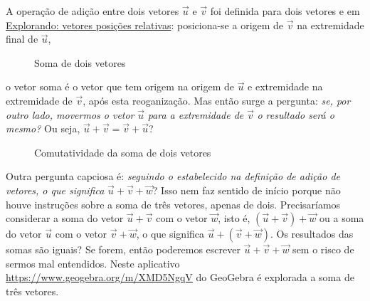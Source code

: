 A operação de adição entre dois vetores \(\vec{u}\) e \(\vec{v}\) foi definida para dois vetores e em \hyperref[vetores-exp1]{Explorando: vetores posições relativas}: posiciona-se a origem de \(\vec{v}\) na extremidade final de \(\vec{u}\),
\begin{figure}[H]\centering{}\caption{Soma de dois vetores}\end{figure}
o vetor soma é o vetor que tem origem na origem de \(\vec{u}\) e extremidade na extremidade de \(\vec{v}\), após esta reoganização.
Mas então surge a pergunta: \textit{se, por outro lado, movermos o vetor} \(\vec{u}\) \textit{para a extremidade de} \(\vec{v}\) \textit{o resultado será o mesmo?}
Ou seja, \(\vec{u}+\vec{v}= \vec{v}+\vec{u}\)?
\begin{figure}[H]\centering{}\caption{Comutatividade da soma de dois vetores}\end{figure}
Outra pergunta capciosa é: \textit{seguindo o estabelecido na definição de adição de vetores, o que significa} \(\vec{u} + \vec{v} + \vec{w}\)? Isso nem faz sentido de início porque não houve instruções sobre a soma de três vetores, apenas de dois. Precisaríamos considerar a soma do vetor \(\vec{u} + \vec{v}\) com o vetor \(\vec{w}\), isto é, \((\vec{u} + \vec{v}) + \vec{w}\) ou a soma do vetor \(\vec{u}\) com o vetor \(\vec{v} + \vec{w}\), o que significa \(\vec{u} + (\vec{v} + \vec{w})\). Os resultados das somas são iguais? Se forem, então poderemos escrever \(\vec{u} + \vec{v} + \vec{w}\) sem o risco de sermos mal entendidos. Neste aplicativo \url{https://www.geogebra.org/m/XMD5NgqV} do GeoGebra é explorada a soma de três vetores.
